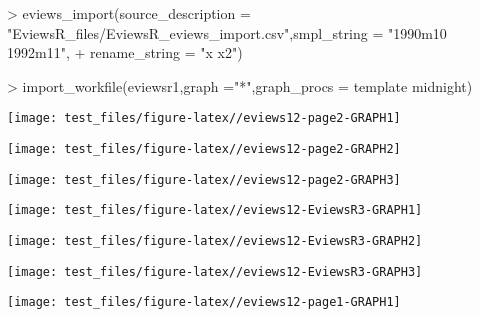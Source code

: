 \documentclass[
]{article}
\newenvironment{Shaded}{\begin{snugshade}}{\end{snugshade}}
\newcommand{\AttributeTok}[1]{\textcolor[rgb]{0.77,0.63,0.00}{#1}}
\newcommand{\FunctionTok}[1]{\textcolor[rgb]{0.00,0.00,0.00}{#1}}
\newcommand{\NormalTok}[1]{#1}
\newcommand{\SpecialCharTok}[1]{\textcolor[rgb]{0.00,0.00,0.00}{#1}}
\newcommand{\StringTok}[1]{\textcolor[rgb]{0.31,0.60,0.02}{#1}}
\begin{document}
\begin{Shaded}
\begin{Highlighting}[]
\SpecialCharTok{\textgreater{}} \FunctionTok{eviews\_import}\NormalTok{(}\AttributeTok{source\_description =} \StringTok{"EviewsR\_files/EviewsR\_eviews\_import.csv"}\NormalTok{,}\AttributeTok{smpl\_string =} \StringTok{"1990m10 1992m11"}\NormalTok{,}
\SpecialCharTok{+} \AttributeTok{rename\_string =} \StringTok{"x x2"}\NormalTok{)}
\end{Highlighting}
\end{Shaded}

\begin{Shaded}
\begin{Highlighting}[]
\SpecialCharTok{\textgreater{}} \FunctionTok{import\_workfile}\NormalTok{(}\StringTok{\textquotesingle{}eviewsr1\textquotesingle{}}\NormalTok{,}\AttributeTok{graph =}\StringTok{"*"}\NormalTok{,}\AttributeTok{graph\_procs =} \StringTok{\textquotesingle{}template midnight\textquotesingle{}}\NormalTok{)}
\end{Highlighting}
\end{Shaded}

\begin{center}\texttt{[image: test\_files/figure-latex//eviews12-page2-GRAPH1]} \end{center}

\begin{center}\texttt{[image: test\_files/figure-latex//eviews12-page2-GRAPH2]} \end{center}

\begin{center}\texttt{[image: test\_files/figure-latex//eviews12-page2-GRAPH3]} \end{center}

\begin{center}\texttt{[image: test\_files/figure-latex//eviews12-EviewsR3-GRAPH1]} \end{center}

\begin{center}\texttt{[image: test\_files/figure-latex//eviews12-EviewsR3-GRAPH2]} \end{center}

\begin{center}\texttt{[image: test\_files/figure-latex//eviews12-EviewsR3-GRAPH3]} \end{center}

\begin{center}\texttt{[image: test\_files/figure-latex//eviews12-page1-GRAPH1]} \end{center}
\end{document}
